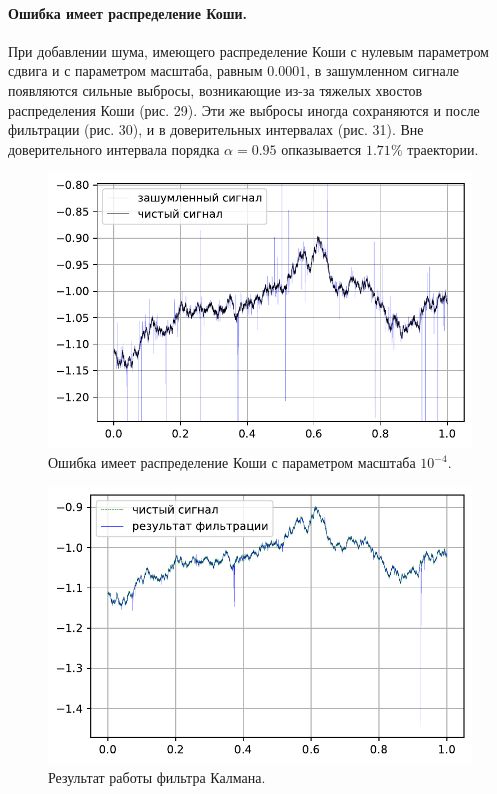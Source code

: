 \documentclass[16pt]{article}
\begin{document}
\paragraph{Ошибка имеет распределение Коши.} При добавлении шума, имеющего распределение Коши с нулевым параметром сдвига и с параметром масштаба, равным $0.0001$, в зашумленном сигнале появляются сильные выбросы, возникающие из-за тяжелых хвостов распределения Коши (рис. 29). Эти же выбросы иногда сохраняются и после фильтрации (рис. 30), и в доверительных интервалах (рис. 31). Вне доверительного интервала порядка $\alpha = 0.95$ опказывается $1.71\%$ траектории.

\newpage

\begin{figure}[h]
	\center
	\includegraphics[scale=0.7]{10_4.pdf}
	\caption{Ошибка имеет распределение Коши с параметром масштаба $10^{-4}$.}
\end{figure}
\begin{figure}[h]
	\center
	\includegraphics[scale=0.7]{10_5.pdf}
	\caption{Результат работы фильтра Калмана.}
\end{figure}
\end{document}
